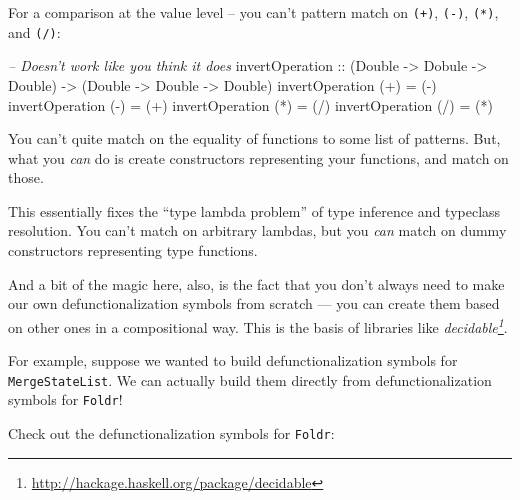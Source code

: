 \documentclass[]{article}
\newenvironment{Shaded}{}{}
\newcommand{\CommentTok}[1]{\textcolor[rgb]{0.38,0.63,0.69}{\textit{#1}}}
\newcommand{\DataTypeTok}[1]{\textcolor[rgb]{0.56,0.13,0.00}{#1}}
\newcommand{\FunctionTok}[1]{\textcolor[rgb]{0.02,0.16,0.49}{#1}}
\newcommand{\NormalTok}[1]{#1}
\newcommand{\OtherTok}[1]{\textcolor[rgb]{0.00,0.44,0.13}{#1}}
\renewcommand{\href}[2]{#2\footnote{\url{#1}}}
\begin{document}
For a comparison at the value level -- you can't pattern match on \texttt{(+)},
\texttt{(-)}, \texttt{(*)}, and \texttt{(/)}:

\begin{Shaded}
\begin{Highlighting}[]
\CommentTok{-- Doesn't work like you think it does}
\OtherTok{invertOperation ::}\NormalTok{ (}\DataTypeTok{Double} \OtherTok{->} \DataTypeTok{Dobule} \OtherTok{->} \DataTypeTok{Double}\NormalTok{) }\OtherTok{->}\NormalTok{ (}\DataTypeTok{Double} \OtherTok{->} \DataTypeTok{Double} \OtherTok{->} \DataTypeTok{Double}\NormalTok{)}
\NormalTok{invertOperation (}\FunctionTok{+}\NormalTok{) }\FunctionTok{=}\NormalTok{ (}\FunctionTok{-}\NormalTok{)}
\NormalTok{invertOperation (}\FunctionTok{-}\NormalTok{) }\FunctionTok{=}\NormalTok{ (}\FunctionTok{+}\NormalTok{)}
\NormalTok{invertOperation (}\FunctionTok{*}\NormalTok{) }\FunctionTok{=}\NormalTok{ (}\FunctionTok{/}\NormalTok{)}
\NormalTok{invertOperation (}\FunctionTok{/}\NormalTok{) }\FunctionTok{=}\NormalTok{ (}\FunctionTok{*}\NormalTok{)}
\end{Highlighting}
\end{Shaded}

You can't quite match on the equality of functions to some list of patterns.
But, what you \emph{can} do is create constructors representing your functions,
and match on those.

This essentially fixes the ``type lambda problem'' of type inference and
typeclass resolution. You can't match on arbitrary lambdas, but you \emph{can}
match on dummy constructors representing type functions.

And a bit of the magic here, also, is the fact that you don't always need to
make our own defunctionalization symbols from scratch --- you can create them
based on other ones in a compositional way. This is the basis of libraries like
\emph{\href{http://hackage.haskell.org/package/decidable}{decidable}}.

For example, suppose we wanted to build defunctionalization symbols for
\texttt{MergeStateList}. We can actually build them directly from
defunctionalization symbols for \texttt{Foldr}!

Check out the defunctionalization symbols for \texttt{Foldr}:
\end{document}
